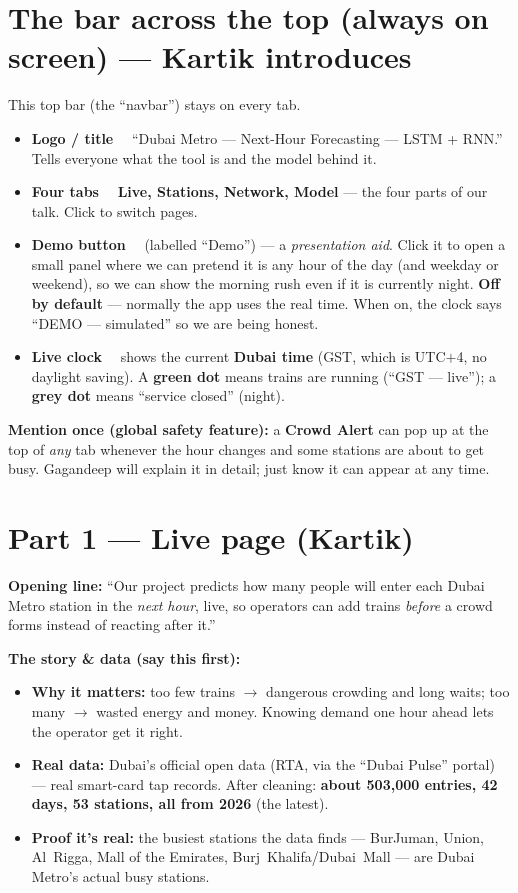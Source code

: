 \documentclass[11pt]{article}
\newcommand{\elem}[1]{\smallskip\noindent\textbf{\color{metroRed}#1}\ \ }
\begin{document}
\section{The bar across the top (always on screen) \textnormal{--- Kartik introduces}}
This top bar (the ``navbar'') stays on every tab.
\begin{itemize}
  \item \elem{Logo / title} ``Dubai Metro --- Next-Hour Forecasting --- LSTM + RNN.'' Tells everyone
        what the tool is and the model behind it.
  \item \elem{Four tabs} \textbf{Live, Stations, Network, Model} --- the four parts of our talk. Click
        to switch pages.
  \item \elem{Demo button} (labelled ``Demo'') --- a \emph{presentation aid}. Click it to open a small
        panel where we can pretend it is any hour of the day (and weekday or weekend), so we can show
        the morning rush even if it is currently night. \textbf{Off by default} --- normally the app
        uses the real time. When on, the clock says ``DEMO --- simulated'' so we are being honest.
  \item \elem{Live clock} shows the current \textbf{Dubai time} (GST, which is UTC$+$4, no daylight
        saving). A \textbf{green dot} means trains are running (``GST --- live''); a \textbf{grey dot}
        means ``service closed'' (night).
\end{itemize}

\noindent\textbf{Mention once (global safety feature):} a \textbf{Crowd Alert} can pop up at the top
of \emph{any} tab whenever the hour changes and some stations are about to get busy. Gagandeep will
explain it in detail; just know it can appear at any time.

\section{Part 1 --- Live page \textnormal{(Kartik)}}
\textbf{Opening line:} ``Our project predicts how many people will enter each Dubai Metro station in
the \emph{next hour}, live, so operators can add trains \emph{before} a crowd forms instead of
reacting after it.''

\textbf{The story \& data (say this first):}
\begin{itemize}
  \item \textbf{Why it matters:} too few trains $\rightarrow$ dangerous crowding and long waits; too
        many $\rightarrow$ wasted energy and money. Knowing demand one hour ahead lets the operator
        get it right.
  \item \textbf{Real data:} Dubai's official open data (RTA, via the ``Dubai Pulse'' portal) ---
        real smart-card tap records. After cleaning: \textbf{about 503{,}000 entries, 42 days,
        53 stations, all from 2026} (the latest).
  \item \textbf{Proof it's real:} the busiest stations the data finds --- BurJuman, Union, Al~Rigga,
        Mall of the Emirates, Burj~Khalifa/Dubai~Mall --- are Dubai Metro's actual busy stations.
\end{itemize}
\end{document}
